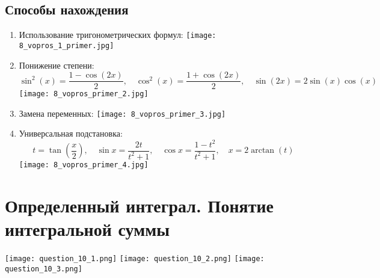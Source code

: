 \documentclass[a4paper,12pt]{article}
\begin{document}
\subsection{Способы нахождения}
\begin{enumerate}
    \item Использование тригонометрических формул:
    \texttt{[image: 8\_vopros\_1\_primer.jpg]}
    \item Понижение степени:
    \[
    \sin^2(x) = \frac{1 - \cos(2x)}{2}, \quad \cos^2(x) = \frac{1 + \cos(2x)}{2}, \quad \sin(2x) = 2 \sin(x) \cos(x)
    \]
    \texttt{[image: 8\_vopros\_primer\_2.jpg]}
    \item Замена переменных:
    \texttt{[image: 8\_vopros\_primer\_3.jpg]}
    \item Универсальная подстановка:
    \[
    t = \tan\left(\frac{x}{2}\right), \quad \sin x = \frac{2t}{t^2 + 1}, \quad \cos x = \frac{1 - t^2}{t^2 + 1}, \quad x = 2 \arctan(t)
    \]
    \texttt{[image: 8\_vopros\_primer\_4.jpg]}
\end{enumerate}

\section{Определенный интеграл. Понятие интегральной суммы}
\texttt{[image: question\_10\_1.png]}
\texttt{[image: question\_10\_2.png]}
\texttt{[image: question\_10\_3.png]}
\end{document}
